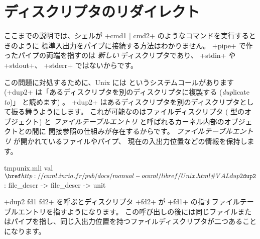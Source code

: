 \section{ディスクリプタのリダイレクト}

ここまでの説明では、シェルが \ml+cmd1 | cmd2+ のようなコマンドを実行するときのように
標準入出力をパイプに接続する方法はわかりません。
\ml+pipe+ で作ったパイプの両端を指すのは \emph{新しい} ディスクリプタであり、
\ml+stdin+ や \ml+stdout+、 \ml+stderr+ ではないからです。

この問題に対処するために、Unix には  というシステムコールがあります
(\ml+dup2+ は「あるディスクリプタを別のディスクリプタに複製する (\emph{dup}licate \emph{to})」 と読めます) 。
\ml+dup2+ はあるディスクリプタを別のディスクリプタとして振る舞うようにします。
これが可能なのはファイルディスクリプタ ( 型のオブジェクト)
と \emph{ファイルテーブルエントリ} と呼ばれるカーネル内部のオブジェクトとの間に
間接参照の仕組みが存在するからです。 \emph{ファイルテーブルエントリ} が開かれているファイルやパイプ、
現在の入出力位置などの情報を保持します。
%
\begin{listingcodefile}{tmpunix.mli}
val $\libvalue{Unix}{dup2}$ : file_descr -> file_descr -> unit
\end{listingcodefile}
%
\ml+dup2 fd1 fd2+ を呼ぶとディスクリプタ \ml+fd2+ が \ml+fd1+ の指すファイルテーブルエントリを指すようになります。
この呼び出しの後には同じファイルまたはパイプを指し、同じ入出力位置を持つファイルディスクリプタが二つあることになります。

